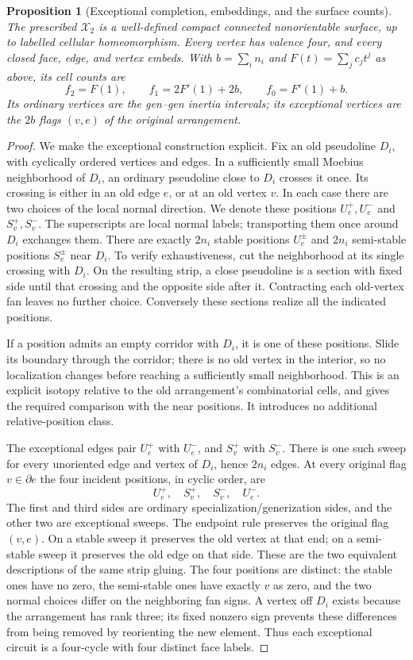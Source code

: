 \documentclass[11pt]{article}
\newtheorem{proposition}[theorem]{Proposition}
\theoremstyle{definition}\newtheorem{definition}[theorem]{Definition}
\begin{document}
\begin{proposition}[Exceptional completion, embeddings, and the surface counts]\label{prop:surface-counts}
The prescribed $\mathcal X_2$ is a well-defined compact connected
nonorientable surface, up to labelled cellular homeomorphism. Every
vertex has valence four, and every closed face, edge, and vertex embeds.
With $b=\sum_i n_i$ and $F(t)=\sum_j c_jt^j$ as above, its cell counts are
\[
 f_2=F(1),\qquad f_1=2F'(1)+2b,\qquad f_0=F'(1)+b.
\]
Its ordinary vertices are the gen--gen inertia intervals; its exceptional
vertices are the $2b$ flags $(v,e)$ of the original arrangement.
\end{proposition}
\begin{proof}
We make the exceptional construction explicit. Fix an old pseudoline
$D_i$, with cyclically ordered vertices and edges. In a sufficiently
small Moebius neighborhood of $D_i$, an ordinary pseudoline close to
$D_i$ crosses it once. Its crossing is either in an old edge $e$, or at
an old vertex $v$. In each case there are two choices of the local
normal direction. We denote these positions $U_e^+,U_e^-$ and
$S_v^+,S_v^-$. The superscripts are local normal labels; transporting
them once around $D_i$ exchanges them. There are exactly $2n_i$ stable
positions $U_e^\pm$ and $2n_i$ semi-stable positions $S_v^\pm$ near
$D_i$. To verify exhaustiveness, cut the neighborhood at its single
crossing with $D_i$. On the resulting strip, a close pseudoline is a
section with fixed side until that crossing and the opposite side
after it. Contracting each old-vertex fan leaves no further choice.
Conversely these sections realize all the indicated positions.

If a position admits an empty corridor with $D_i$, it is one of these
positions. Slide its boundary through the corridor; there is no old
vertex in the interior, so no localization changes before reaching
a sufficiently small neighborhood. This is an explicit isotopy
relative to the old arrangement's combinatorial cells, and gives
the required comparison with the near positions. It introduces no
additional relative-position class.

The exceptional edges pair $U_e^+$ with $U_e^-$, and $S_v^+$ with
$S_v^-$. There is one such sweep for every unoriented edge and vertex
of $D_i$, hence $2n_i$ edges. At every original flag $v\in\partial e$
the four incident positions, in cyclic order, are
\[
 U_e^+,\quad S_v^+,\quad S_v^-,\quad U_e^-.
\]
The first and third sides are ordinary specialization/generization
sides, and the other two are exceptional sweeps. The endpoint rule
preserves the original flag $(v,e)$. On a stable sweep it preserves
the old vertex at that end; on a semi-stable sweep it preserves the
old edge on that side. These are the two equivalent descriptions of
the same strip gluing. The four positions are distinct: the stable
ones have no zero, the semi-stable ones have exactly $v$ as zero,
and the two normal choices differ on the neighboring fan signs.
A vertex off $D_i$ exists because the arrangement has rank three;
its fixed nonzero sign prevents these differences from being removed
by reorienting the new element. Thus each exceptional circuit is a
four-cycle with four distinct face labels.


\end{proof}
\end{document}
